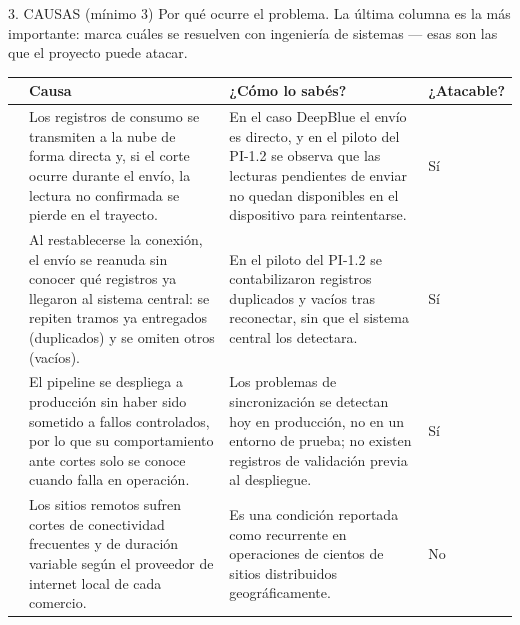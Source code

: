 \documentclass[11pt,a4paper]{article}
\newcommand{\tblhead}{\rowcolor{gris800}}
\begin{document}
\begin{seccion}{\faSearch}{3. CAUSAS (mínimo 3)}
{\small Por qué ocurre el problema. La última columna es la más importante: marca cuáles se resuelven con ingeniería de sistemas --- esas son las que el proyecto puede atacar.}
\vspace{4pt}
\renewcommand{\arraystretch}{1.35}
\begin{tabularx}{\linewidth}{>{\centering\arraybackslash}p{0.6cm} X >{\raggedright\arraybackslash}p{3.8cm} >{\centering\arraybackslash}p{2.0cm}}
  \toprule
  \tblhead {\color{white}\bfseries N.\textordmasculine} & {\color{white}\bfseries Causa} & {\color{white}\bfseries ¿Cómo lo sabés?} & {\color{white}\bfseries ¿Atacable?} \\
  \midrule
  1 & Los registros de consumo se transmiten a la nube de forma directa y, si el corte ocurre durante el envío, la lectura no confirmada se pierde en el trayecto. & En el caso DeepBlue el envío es directo, y en el piloto del PI-1.2 se observa que las lecturas pendientes de enviar no quedan disponibles en el dispositivo para reintentarse. & Sí \\
  2 & Al restablecerse la conexión, el envío se reanuda sin conocer qué registros ya llegaron al sistema central: se repiten tramos ya entregados (duplicados) y se omiten otros (vacíos). & En el piloto del PI-1.2 se contabilizaron registros duplicados y vacíos tras reconectar, sin que el sistema central los detectara. & Sí \\
  3 & El pipeline se despliega a producción sin haber sido sometido a fallos controlados, por lo que su comportamiento ante cortes solo se conoce cuando falla en operación. & Los problemas de sincronización se detectan hoy en producción, no en un entorno de prueba; no existen registros de validación previa al despliegue. & Sí \\
  4 & Los sitios remotos sufren cortes de conectividad frecuentes y de duración variable según el proveedor de internet local de cada comercio. & Es una condición reportada como recurrente en operaciones de cientos de sitios distribuidos geográficamente. & No \\
  \bottomrule
\end{tabularx}
\end{seccion}
\end{document}
